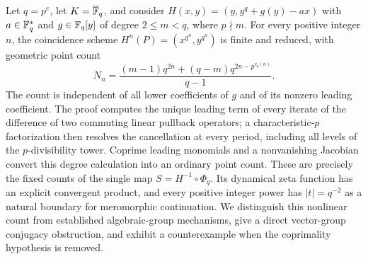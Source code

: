 Let $q=p^e$, let $K=\overline{\mathbb F}_q$, and consider
$H(x,y)=(y,y^q+g(y)-ax)$ with $a\in\mathbb F_q^*$ and
$g\in\mathbb F_q[y]$ of degree $2\le m<q$, where $p\nmid m$.
For every positive integer $n$, the coincidence scheme
$H^n(P)=(x^{q^n},y^{q^n})$ is finite and reduced, with geometric point count
\[
  N_n=\frac{(m-1)q^{2n}+(q-m)q^{2n-p^{v_p(n)}}}{q-1}.
\]
The count is independent of all lower coefficients of $g$ and of its
nonzero leading coefficient. The proof computes the unique leading term
of every iterate of the difference of two commuting linear pullback
operators; a characteristic-$p$ factorization then resolves the cancellation
at every period, including all levels of the $p$-divisibility tower.
Coprime leading monomials and a nonvanishing Jacobian convert this degree
calculation into an ordinary point count. These are precisely the fixed
counts of the single map $S=H^{-1}\circ\Phi_q$. Its dynamical zeta function
has an explicit convergent product, and every positive integer power has
$|t|=q^{-2}$ as a natural boundary for meromorphic continuation.
We distinguish this nonlinear count from established algebraic-group
mechanisms, give a direct vector-group conjugacy obstruction, and exhibit
a counterexample when the coprimality hypothesis is removed.
